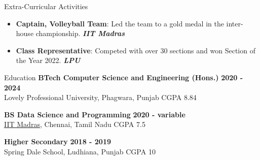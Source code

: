 \documentclass{resume} %
\begin{document}
\begin{rSection}{Extra-Curricular Activities} 
\begin{itemize}[noitemsep]
    \item \textbf{Captain, Volleyball Team}: Led the team to a gold medal in the inter-house championship. \hfill \textit{\textbf{IIT Madras}}
    \item \textbf{Class Representative}: Competed with over 30 sections and won Section of the Year 2022. \hfill \textit{\textbf{LPU}}
\end{itemize}
\end{rSection}


\begin{rSection}{Education}
{\bf BTech Computer Science and Engineering (Hons.)} \hfill \textbf{2020 - 2024} \\
Lovely Professional University, Phagwara, Punjab \hfill CGPA 8.84

{\bf BS Data Science and Programming} \hfill \textbf{2020 - variable} \\
\href{https://study.iitm.ac.in/ds/}{IIT Madras}, Chennai, Tamil Nadu \hfill CGPA 7.5

{\bf Higher Secondary} \hfill \textbf{2018 - 2019} \\
Spring Dale School, Ludhiana, Punjab \hfill CGPA 10
\end{rSection} 
\end{document}
